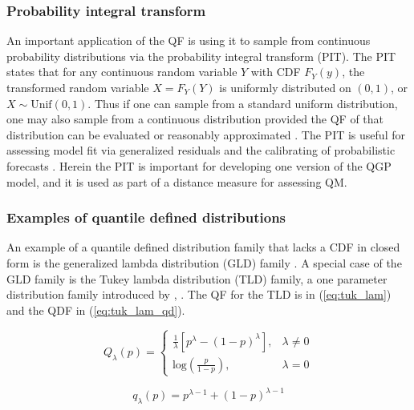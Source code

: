 \documentclass[preprint,12pt,authoryear]{elsarticle}
\begin{document}
\subsubsection{Probability integral transform}
An important application of the QF is using it to sample from continuous probability distributions via the probability integral transform (PIT). The PIT states that for any continuous random variable $Y$ with CDF $F_Y(y)$, the transformed random variable $X = F_Y(Y)$ is uniformly distributed on $(0,1)$, or $X \sim \text{Unif}(0,1)$. Thus if one can sample from a standard uniform distribution, one may also sample from a continuous distribution provided the QF of that distribution can be evaluated or reasonably approximated \cite[]{wilkinson2018stochastic}. The PIT is useful for assessing model fit via generalized residuals \cite[]{yang2024double, cox1968general} and the calibrating of probabilistic forecasts \cite[]{gneiting2007probabilistic}. Herein the PIT is important for developing one version of the QGP model, and it is used as part of a distance measure for assessing QM.

\subsubsection{Examples of quantile defined distributions} \label{sec:quant_def_dist}

An example of a quantile defined distribution family that lacks a CDF in closed form is the generalized lambda distribution (GLD) family \cite[]{ramberg1974approximate, perepolkin2023tenets}. A special case of the GLD family is the Tukey lambda distribution (TLD) family, a one parameter distribution family introduced by \cite{tukey1960practical}, \cite[]{joiner1971some}. The QF for the TLD is in (\ref{eq:tuk_lam}) and the QDF in (\ref{eq:tuk_lam_qd}).   

\begin{equation}
    \label{eq:tuk_lam}
    Q_{\lambda}(p) = \begin{cases} 
      \frac{1}{\lambda} \left[p^{\lambda} - (1 - p)^{\lambda} \right], & \lambda \neq 0 \\
      \text{log} \left(\frac{p}{1 - p} \right), & \lambda = 0
   \end{cases}
\end{equation}

\begin{equation}
    \label{eq:tuk_lam_qd}
    q_{\lambda}(p) = p^{\lambda - 1} + (1-p)^{\lambda -1} 
\end{equation}
\end{document}
